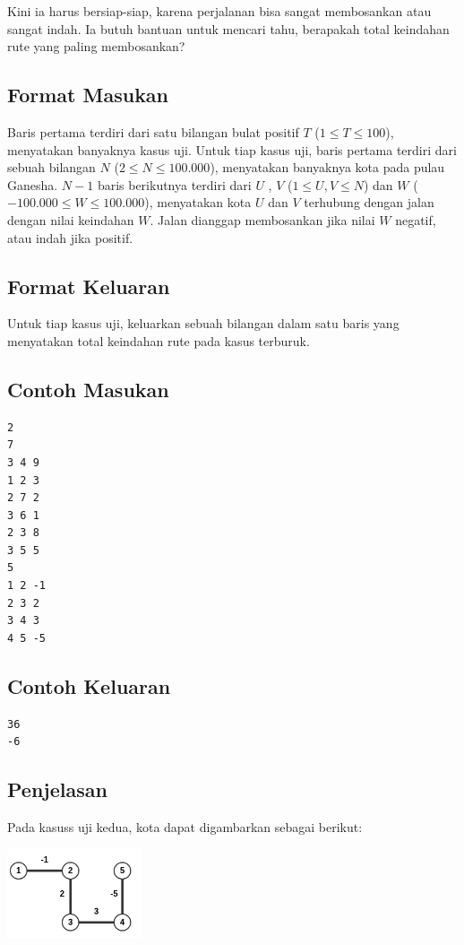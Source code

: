 \documentclass{article}
\begin{document}
Kini ia harus bersiap-siap, karena perjalanan bisa sangat membosankan atau sangat indah.
Ia butuh bantuan untuk mencari tahu, berapakah total keindahan rute yang paling membosankan?

\subsection*{Format Masukan}
Baris pertama terdiri dari satu bilangan bulat positif $T$ ($1 \leq T \leq 100$), menyatakan banyaknya kasus uji.
Untuk tiap kasus uji, baris pertama terdiri dari sebuah bilangan $N$ ($2 \leq N \leq 100.000$), menyatakan banyaknya kota pada pulau Ganesha.
$N-1$ baris berikutnya terdiri dari $U$ , $V$ ($1 \leq U, V \leq N$) dan $W$ ($-100.000 \leq W \leq 100.000$), menyatakan kota $U$ dan $V$ terhubung dengan jalan dengan nilai keindahan $W$.
Jalan dianggap membosankan jika nilai $W$ negatif, atau indah jika positif.

\subsection*{Format Keluaran}
Untuk tiap kasus uji, keluarkan sebuah bilangan dalam satu baris yang menyatakan total keindahan rute pada kasus terburuk.

\pagebreak

\begin{multicols}{2}
\subsection*{Contoh Masukan}
\begin{lstlisting}
2
7
3 4 9
1 2 3
2 7 2
3 6 1
2 3 8
3 5 5
5
1 2 -1
2 3 2
3 4 3
4 5 -5
\end{lstlisting}
\columnbreak
\subsection*{Contoh Keluaran}
\begin{lstlisting}
36
-6
\end{lstlisting}
\vfill
\null
\end{multicols}

\subsection*{Penjelasan}
Pada kasuss uji kedua, kota dapat digambarkan sebagai berikut:

\includegraphics[width=150px]{sample-2}
\end{document}
